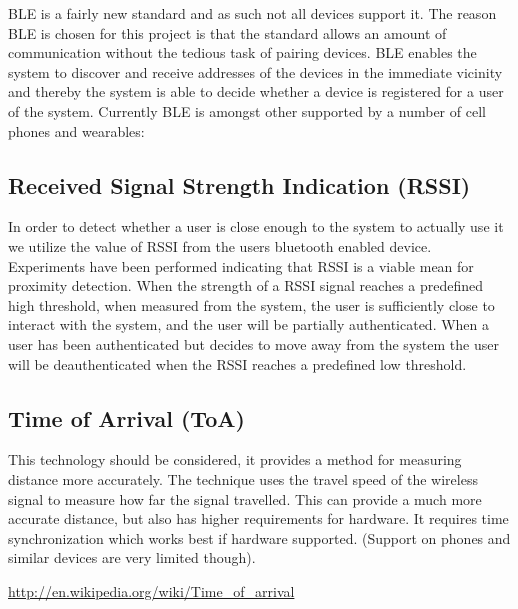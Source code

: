 BLE is a fairly new standard and as such not all devices support it.
The reason BLE is chosen for this project is that the standard allows an amount of communication without the tedious task of pairing devices.
BLE enables the system to discover and receive addresses of the devices in the immediate vicinity and thereby the system is able to decide whether a device is registered for a user of the system.
Currently BLE is amongst other supported by a number of cell phones and wearables:


\subsection{Received Signal Strength Indication (RSSI)}

In order to detect whether a user is close enough to the system to actually use it we utilize the value of RSSI from the users bluetooth enabled device.
Experiments have been performed indicating that RSSI is a viable mean for proximity detection\cite{ref:Takashi}.
When the strength of a RSSI signal reaches a predefined high threshold, when measured from the system, the user is sufficiently close to interact with the system, and the user will be partially authenticated.
When a user has been authenticated but decides to move away from the system the user will be deauthenticated when the RSSI reaches a predefined low threshold.

\subsection{Time of Arrival (ToA)} %
This technology should be considered, it provides a method for measuring distance more accurately.
The technique uses the travel speed of the wireless signal to measure how far the signal travelled.
This can provide a much more accurate distance, but also has higher requirements for hardware.
It requires time synchronization which works best if hardware supported. (Support on phones and similar devices are very limited though). %

\url{http://en.wikipedia.org/wiki/Time_of_arrival}


